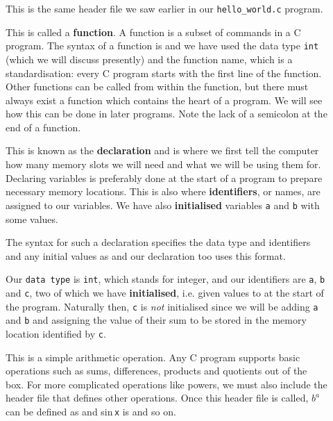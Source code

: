 \documentclass[11pt,oneside]{article}
\begin{document}
\begin{description}
\item[] This is the same header file we saw earlier in our \verb+hello_world.c+ program.

\item[] This is called a \textbf{function}. A function is a subset of commands in a C program. The syntax of a function is  and we have used the data type \verb+int+ (which we will discuss presently) and the function name,  which is a standardisation: every C program starts with the first line of the  function. Other functions can be called from within the  function, but there must always exist a  function which contains the heart of a program. We will see how this can be done in later programs. Note the lack of a semicolon at the end of a function.

\item[] This is known as the \textbf{declaration} and is where we first tell the computer how many memory slots we will need and what we will be using them for. Declaring variables is preferably done at the start of a program to prepare necessary memory locations. This is also where \textbf{identifiers}, or names, are assigned to our variables. We have also \textbf{initialised} variables \verb+a+ and \verb+b+ with some values.

The syntax for such a declaration specifies the data type and identifiers and any initial values as  and our declaration too uses this format.

Our \verb+data type+ is \verb+int+, which stands for integer, and our identifiers are \verb+a+, \verb+b+ and \verb+c+, two of which we have \textbf{initialised}, i.e. given values to at the start of the program. Naturally then, \verb+c+ is \textit{not} initialised since we will be adding \verb+a+ and \verb+b+ and assigning the value of their sum to be stored in the memory location identified by \verb+c+.

\item[] This is a simple arithmetic operation. Any C program supports basic operations such as sums, differences, products and quotients out of the box. For more complicated operations like powers, we must also include the  header file that defines other operations. Once this header file is called, $b^a$ can be defined as  and sin\,\verb+x+ is  and so on.


\end{description}
\end{document}
